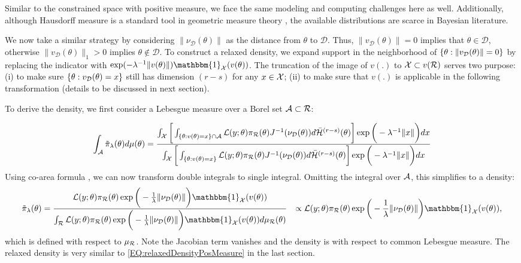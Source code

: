 \documentclass[10pt,fleqn]{article} \pdfoutput=1
\DeclareMathOperator{\1}{\mathbbm{1}} \DeclareMathOperator{\bigO}{\mc O}
\begin{document}
Similar to the constrained space with positive measure, we face the same modeling and computing challenges here as well.
Additionally, although Hausdorff measure is a standard tool in
geometric measure theory \citep{federer2014geometric}, the available
distributions are scarce in Bayesian literature.

We now take a similar strategy by considering
$\|\nu_\mathcal{D}(\theta)\|$ as the distance from $\theta$ to
$\mathcal{D}.$ Thus, $\|v_\mathcal{D}(\theta)\| =
	0$ implies that $\theta \in \mathcal{D}$, otherwise
$\|v_\mathcal{D}(\theta)\|_1 >0$ implies $\theta\notin\mathcal{D}.$
To construct a relaxed density, we expand support in the neighborhood of
$\{\theta:\|v_{\mathcal{D}}(\theta)\|=0\}$ by replacing the indicator with 
$\exp( -{\lambda^{-1}}\|v(\theta)\|)
\mathbbm{1}_{\mc X}(v(\theta))$. The truncation of the image of $v(.)$ to
$\mathcal{X}\subset v(\mathcal{R})$ serves two purpose: (i) to make sure
$\{\theta:v_{\mathcal{D}}(\theta)=x\}$ still has dimension $(r-s)$ for any $x\in \mathcal{X}$; (ii) to make sure that $v(.)$ is applicable in the following
transformation (details to be discussed in
next section).

To derive the density, we first
consider a Lebesgue measure over a Borel set $\mathcal{A} \subset \mathcal{R}$:

$$\int_{\mathcal{A}} \tilde{\pi}_\lambda(\theta) d \mu(\theta)=
\frac{\int_{\mathcal{X}} \bigg[ \int_{ \{\theta:v(\theta)=x\}\cap \mathcal{A} }
	{\mathcal{L}(y;\theta)\pi_\mathcal{R}(\theta)}{J^{-1}(\nu_\mathcal{D}(\theta))}
d\bar{\mathcal{H}}^{(r-s)}(\theta) \bigg]
\exp\bigg(-{\lambda^{-1}}\|x\|\bigg )dx
}
{\int_{\mathcal{X}} \bigg[ \int_{\{\theta:v(\theta)=x\}}
	{\mathcal{L}(y;\theta)\pi_\mathcal{R}(\theta)}{J^{-1}(\nu_\mathcal{D}(\theta))}
d\bar{\mathcal{H}}^{(r-s)}(\theta) \bigg]
\exp\bigg(-{\lambda^{-1}}\|x\|\bigg )dx
}$$ 
Using co-area formula \citep{federer2014geometric}, we can now
transform double integrals to single integral. Omitting 
the integral over $\mathcal{A}$, this simplifies to a density:
\begin{equation}
 \begin{split} 
\label{EQ:relaxedDensityZeroMeasure} 
 \tilde{\pi}_\lambda(\theta) &=
		\dfrac{\mathcal{L}(y;\theta)
			\pi_\mathcal{R}(\theta)\exp\bigg(-\frac{1}{\lambda}\|\nu_\mathcal{D}(\theta)\|\bigg)  
			\mathbbm{1}_{\mc X}(v(\theta))
			}{\int_\mathcal{R} 
			\mathcal{L}(y;\theta)
			\pi_\mathcal{R}(\theta)\exp\bigg(-\frac{1}{\lambda}\|\nu_\mathcal{D}(\theta)\|\bigg) \mathbbm{1}_{\mc X}(v(\theta))
			d\mu_\mathcal{R}(\theta) } & \propto \mathcal{L}(y;\theta)
		\pi_\mathcal{R}(\theta)\exp\bigg(-\frac{1}{\lambda}\|\nu_\mathcal{D}(\theta)\|\bigg) \mathbbm{1}_{\mc X}(v(\theta)),
	\end{split} \end{equation}
which is defined with respect to $\mu_{\mathcal{R}}$. Note the Jacobian term
vanishes and the density is with respect to common Lebesgue measure. 
The relaxed density is very similar
to \eqref{EQ:relaxedDensityPosMeasure} in the last section. 
\end{document}
